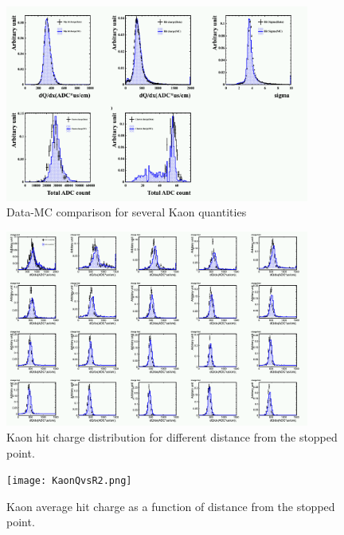 \documentclass{cernyrep}
\begin{document}
\begin{figure}[htbp]
 \begin{center}
  \includegraphics[width=100mm,bb=0 0 861 556]{KaonDataMC.png}
 \end{center}
 \caption{Data-MC comparison for several Kaon quantities}
 \label{fig:KaonDataMC}
\end{figure}

\begin{figure}[htbp]
 \begin{center}
  \includegraphics[width=100mm,bb=0 0 861 556]{KaonQvsR.png}
 \end{center}
 \caption{Kaon hit charge distribution for different distance from the stopped point.}
 \label{fig:KaonQvsR}
\end{figure}

\begin{figure}[htbp]
 \begin{center}
  \texttt{[image: KaonQvsR2.png]}
 \end{center}
 \caption{Kaon average hit charge as a function of distance from the stopped point.}
 \label{fig:KaonQvsR2}
\end{figure}
\end{document}
